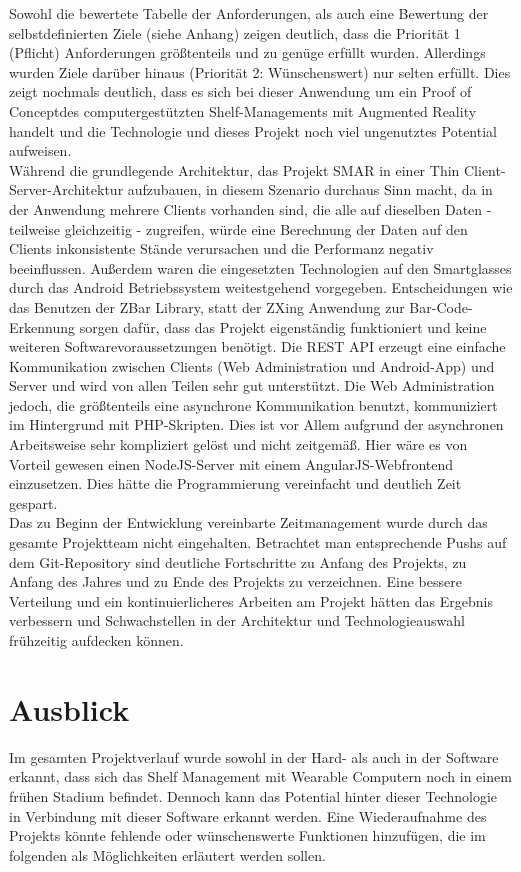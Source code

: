 Sowohl die bewertete Tabelle der Anforderungen, als auch eine Bewertung der selbstdefinierten Ziele (siehe Anhang) zeigen deutlich, dass die Priorität 1 (Pflicht) Anforderungen größtenteils und zu genüge erfüllt wurden. Allerdings wurden Ziele darüber hinaus (Priorität 2: Wünschenswert) nur selten erfüllt. Dies zeigt nochmals deutlich, dass es sich bei dieser Anwendung um ein \glqq Proof of Concept\grqq des computergestützten Shelf-Managements mit Augmented Reality handelt und die Technologie und dieses Projekt noch viel ungenutztes Potential aufweisen.\\

Während die grundlegende Architektur, das Projekt \ac{SMAR} in einer Thin Client-Server-Architektur aufzubauen, in diesem Szenario durchaus Sinn macht, da in der Anwendung mehrere Clients vorhanden sind, die alle auf dieselben Daten - teilweise gleichzeitig - zugreifen, würde eine Berechnung der Daten auf den Clients inkonsistente Stände verursachen und die Performanz negativ beeinflussen. Außerdem waren die eingesetzten Technologien auf den Smartglasses durch das Android Betriebssystem weitestgehend vorgegeben. Entscheidungen wie \zB das Benutzen der ZBar Library, statt der ZXing Anwendung zur Bar-Code-Erkennung sorgen dafür, dass das Projekt eigenständig funktioniert und keine weiteren Softwarevoraussetzungen benötigt. Die \ac{REST} \ac{API} erzeugt eine einfache Kommunikation zwischen Clients (Web Administration und Android-App) und Server und wird von allen Teilen sehr gut unterstützt. Die Web Administration jedoch, die größtenteils eine asynchrone Kommunikation benutzt, kommuniziert im Hintergrund mit PHP-Skripten. Dies ist vor Allem aufgrund der asynchronen Arbeitsweise sehr kompliziert gelöst und nicht zeitgemäß. Hier wäre es von Vorteil gewesen einen NodeJS-Server mit einem AngularJS-Webfrontend einzusetzen. Dies hätte die Programmierung vereinfacht und deutlich Zeit gespart.\\

Das zu Beginn der Entwicklung vereinbarte Zeitmanagement wurde durch das gesamte Projektteam nicht eingehalten. Betrachtet man entsprechende Pushs auf dem Git-Repository sind deutliche Fortschritte zu Anfang des Projekts, zu Anfang des Jahres und zu Ende des Projekts zu verzeichnen. Eine bessere Verteilung und ein kontinuierlicheres Arbeiten am Projekt hätten das Ergebnis verbessern und Schwachstellen in der Architektur und Technologieauswahl frühzeitig aufdecken können.

\chapter{Ausblick}
\label{cha:ausblick}
Im gesamten Projektverlauf wurde sowohl in der Hard- als auch in der Software erkannt, dass sich das Shelf Management mit Wearable Computern noch in einem frühen Stadium befindet. Dennoch kann das Potential hinter dieser Technologie in Verbindung mit dieser Software erkannt werden. Eine Wiederaufnahme des Projekts könnte fehlende oder wünschenswerte Funktionen hinzufügen, die im folgenden als Möglichkeiten erläutert werden sollen.\\

